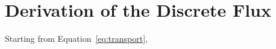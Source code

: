 \section{Derivation of the Discrete Flux}
\label{app:flux}

Starting from Equation~\eqref{eq:transport}, \lipsum[19]
